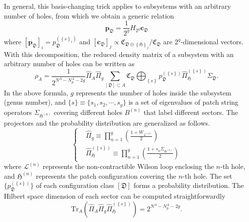 \documentclass[12font]{article}
\theoremstyle{definition}
\newcommand{\lr}[1]{\left(  #1  \right)}
\newcommand{\lrg}[1]{\left\{  #1  \right\}}
\newcommand{\mrm}[1]{\mathrm{#1}}
\newcommand{\Tr}{\mrm{Tr}}
\begin{document}
In general, this basis-changing trick applies to subsystems with an arbitrary number of holes, from which we obtain a generic relation
\[
\mathbf{p}_{\mathfrak{D}} = \frac{1}{2^g} H_{2^g} \mathbf{c}_\mathfrak{D}
\]
where $[\mathbf{p}_\mathfrak{D}]_{i} = p^{(\lrg{s}_i)}_\mathfrak{D}$ and $[\mathbf{c}_{\mathfrak{D}}]_{j} \propto \mathfrak{C}_{\mathfrak{D}\ominus\lrg{\mathfrak{H}}_j}/\mathfrak{C}_\mathfrak{D}$ are $2^g$-dimensional vectors. With this decomposition, the reduced density matrix of a subsystem with an arbitrary number of holes can be written as
\begin{equation}
    \rho_A
    =
    \frac{1}{2^{N^A - N^A_p - 2g}}
    \hat{\Pi}_A
    \hat{\Pi}_g
    \sum_{[\mathfrak{D}]\subset A}
    \mathfrak{C}_\mathfrak{D}
    \bigoplus_{\lrg{s}}
    p_\mathfrak{D}^{(\lrg{s})}
    \hat{\Pi}_\mathfrak{H}^{(\lrg{s})}
    \Sigma_\mathfrak{D}.
\end{equation}
In the above formula, $g$ represents the number of holes inside the subsystem (genus number), and $\{s\} \equiv \{s_1, s_2,\cdots,s_g\}$ is a set of eigenvalues of patch string operators $\Sigma_{\mathfrak{H}^{(n)}}$ covering different holes $B^{(n)}$ that label different sectors. The projectors and the probability distribution are generalized as follows.
\begin{equation}
    \left\{
    \begin{aligned}
        &\hat{\Pi}_g \equiv
        \prod_{n=1}^{g}\lr{\frac{\mathds{1} + W_{\mathcal{L}^{(n)}}}{2}} \\
        &\hat{\Pi}_\mathfrak{H}^{(\lrg{s})} \equiv 
        \prod_{n=1}^{g}\lr{\frac{\mathds{1} + s_n\Sigma_{\mathfrak{H}^{(n)}}}{2}}  
    \end{aligned}
    \right.
\end{equation}
where $\mathcal{L}^{(n)}$ represents the non-contractible Wilson loop enclosing the $n$-th hole, and $\mathfrak{H}^{(n)}$ represents the patch configuration covering the $n$-th hole. The set $\{p_\mathfrak{D}^{(\lrg{s})} \}$ of each configuration class $[\mathfrak{D}]$ forms a probability distribution. The Hilbert space dimension of each sector can be computed straightforwardly
\[
\Tr_A
\lr{
\hat{\Pi}_A \hat{\Pi}_g \hat{\Pi}^{(\lrg{s})}_{\mathfrak{H}}
}
=
2^{N^A - N^A_p - 2g}.
\]
\end{document}
